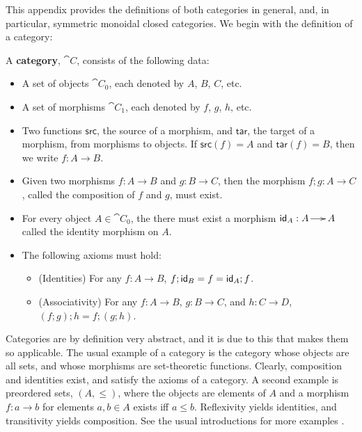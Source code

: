 This appendix provides the definitions of both categories in general,
and, in particular, symmetric monoidal closed categories.  We begin
with the definition of a category:
\begin{definition}
  \label{def:category}
  A \textbf{category}, $\cat{C}$, consists of the following data:
  \begin{itemize}
  \item A set of objects $\cat{C}_0$, each denoted by $A$, $B$, $C$, etc.
  \item A set of morphisms $\cat{C}_1$, each denoted by $f$, $g$, $h$, etc.
  \item Two functions $\mathsf{src}$, the source of a morphism, and
    $\mathsf{tar}$, the target of a morphism, from morphisms to
    objects.  If $\mathsf{src}(f) = A$ and $\mathsf{tar}(f) = B$, then
    we write $f : A \to B$.
  \item Given two morphisms $f : A \to B$ and $g : B \to C$, then the
    morphism $f;g : A \to C$, called the composition of $f$ and $g$,
    must exist.
  \item For every object $A \in \cat{C}_0$, the there must exist a
    morphism $\mathsf{id}_A : A \to A$ called the identity morphism on $A$.

  \item The following axioms must hold:
    \begin{itemize}
    \item (Identities) For any $f : A \to B$, $f;\mathsf{id}_B = f = \mathsf{id}_A;f$.
    \item (Associativity) For any $f : A \to B$, $g : B \to C$, and $h
      : C \to D$, $(f;g);h = f;(g;h)$.
    \end{itemize}
  \end{itemize}
\end{definition}

Categories are by definition very abstract, and it is due to this that
makes them so applicable.  The usual example of a category is the
category whose objects are all sets, and whose morphisms are
set-theoretic functions.  Clearly, composition and identities exist,
and satisfy the axioms of a category.  A second example is preordered
sets, $(A , \leq)$, where the objects are elements of $A$ and a
morphism $f : a \to b$ for elements $a, b \in A$ exists iff $a \leq
b$. Reflexivity yields identities, and transitivity yields
composition.  See the usual introductions for more examples \cite{?}.


